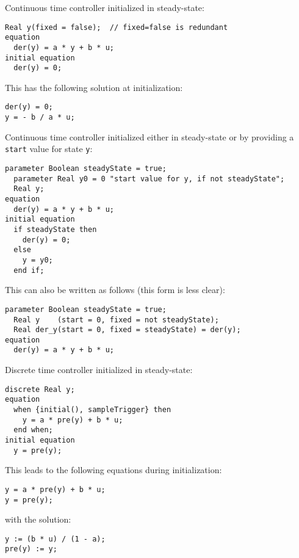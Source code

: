 \begin{example}
Continuous time controller initialized in steady-state:
\begin{lstlisting}[language=modelica]
  Real y(fixed = false);  // fixed=false is redundant
equation
  der(y) = a * y + b * u;
initial equation
  der(y) = 0;
\end{lstlisting}

This has the following solution at initialization:
\begin{lstlisting}[language=modelica]
der(y) = 0;
y = - b / a * u;
\end{lstlisting}
\end{example}

\begin{example}
Continuous time controller initialized either in steady-state or by providing a \lstinline!start! value for state \lstinline!y!:
\begin{lstlisting}[language=modelica]
  parameter Boolean steadyState = true;
  parameter Real y0 = 0 "start value for y, if not steadyState";
  Real y;
equation
  der(y) = a * y + b * u;
initial equation
  if steadyState then
    der(y) = 0;
  else
    y = y0;
  end if;
\end{lstlisting}

This can also be written as follows (this form is less clear):
\begin{lstlisting}[language=modelica]
  parameter Boolean steadyState = true;
  Real y    (start = 0, fixed = not steadyState);
  Real der_y(start = 0, fixed = steadyState) = der(y);
equation
  der(y) = a * y + b * u;
\end{lstlisting}
\end{example}

\begin{example}
Discrete time controller initialized in steady-state:
\begin{lstlisting}[language=modelica]
  discrete Real y;
equation
  when {initial(), sampleTrigger} then
    y = a * pre(y) + b * u;
  end when;
initial equation
  y = pre(y);
\end{lstlisting}

This leads to the following equations during initialization:
\begin{lstlisting}[language=modelica]
y = a * pre(y) + b * u;
y = pre(y);
\end{lstlisting}
with the solution:
\begin{lstlisting}[language=modelica]
y := (b * u) / (1 - a);
pre(y) := y;
\end{lstlisting}
\end{example}

